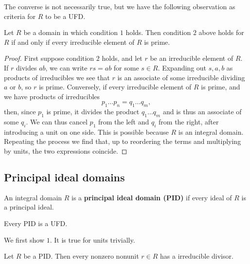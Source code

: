 The converse is not necessarily true, but we have the following observation as criteria for $ R $ to be a UFD.

\begin{proposition}
Let $ R $ be a domain in which condition $ 1 $ holds. Then condition $ 2 $ above holds for $ R $ if and only if every irreducible element of $ R $ is prime.
\end{proposition}

\begin{proof}
First suppose condition $ 2 $ holds, and let $ r $ be an irreducible element of $ R $. If $ r $ divides $ ab $, we can write $ rs = ab $ for some $ s \in R $. Expanding out $ s, a, b $ as products of irreducibles we see that $ r $ is an associate of some irreducible dividing $ a $ or $ b $, so $ r $ is prime. Conversely, if every irreducible element of $ R $ is prime, and we have products of irreducibles
$$ p_1 \dots p_n = q_1 \dots q_m, $$
then, since $ p_1 $ is prime, it divides the product $ q_1 \dots q_m $ and is thus an associate of some $ q_i $. We can thus cancel $ p_1 $ from the left and $ q_i $ from the right, after introducing a unit on one side. This is possible because $ R $ is an integral domain. Repeating the process we find that, up to reordering the terms and multiplying by units, the two expressions coincide.
\end{proof}

\subsection{Principal ideal domains}

\begin{definition}
An integral domain $ R $ is a \textbf{principal ideal domain (PID)} if every ideal of $ R $ is a principal ideal.
\end{definition}

\begin{theorem}
\label{thm:3.3.2}
Every PID is a UFD.
\end{theorem}

We first show $ 1 $. It is true for units trivially.

\begin{lemma}
Let $ R $ be a PID. Then every nonzero nonunit $ r \in R $ has a irreducible divisor.
\end{lemma}

